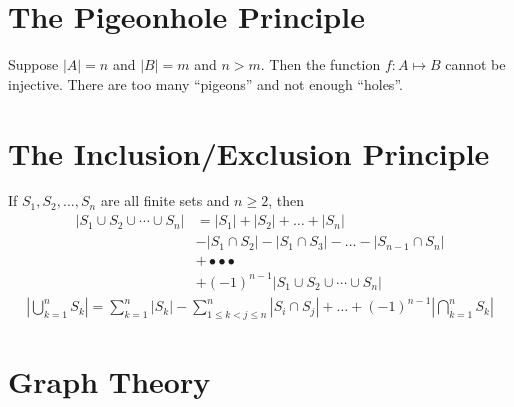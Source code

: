 \documentclass[../main.tex]{subfiles}
\begin{document}
\section{The Pigeonhole Principle}
\label{sec:the_pigeonhole_principle}

Suppose $|A|=n$ and $|B|=m$ and $n>m$. Then the function $f:A\mapsto B$ cannot
be injective. There are too many ``pigeons'' and not enough ``holes''.

\section{The Inclusion/Exclusion Principle}
\label{sec:the_inclusion_exclusion_principle}

If $S_1,S_2,\ldots,S_n$ are all finite sets and $n\geq 2$, then
\begin{align}
  \left|S_1\cup S_2 \cup \cdots \cup S_n\right| &=
  |S_1|+|S_2|+\ldots+|S_n|\\
  &-|S_1\cap S_2| - |S_1\cap S_3| -\ldots -|S_{n-1}\cap S_n|\\
  &+\bullet \bullet \bullet\\
  &+{\left(-1\right)}^{n-1}\left|S_1\cup S_2\cup \cdots \cup S_n\right|
\end{align}
\begin{align}
  \left|\bigcup_{k=1}^{n}S_k\right|=\sum_{k=1}^{n}\left|S_k\right| - \sum_{1\leq k
  < j \leq n}^{n}\left|S_i \cap S_j\right| + \ldots +
  {\left(-1\right)}^{n-1}\left|\bigcap_{k=1}^{n} S_k\right|
\end{align}

\section{Graph Theory}
\label{sec:graph_theory}
\end{document}
